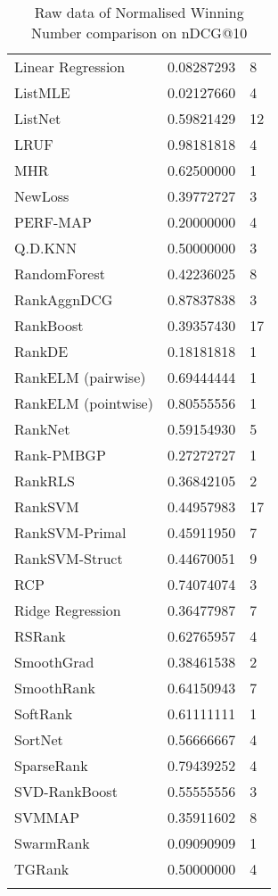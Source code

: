 \begin{longtable}{l|l|l}
Linear Regression & 0.08287293 & 8 \\ 
List\acs{MLE} & 0.02127660 & 4 \\ 
ListNet & 0.59821429 & 12 \\ 
LRUF & 0.98181818 & 4 \\ 
MHR & 0.62500000 & 1 \\ 
NewLoss & 0.39772727 & 3 \\ 
PERF-\acs{MAP} & 0.20000000 & 4 \\ 
Q.D.\acs{KNN} & 0.50000000 & 3 \\ 
RandomForest & 0.42236025 & 8 \\ 
RankAgg\acs{nDCG} & 0.87837838 & 3 \\ 
RankBoost & 0.39357430 & 17 \\ 
RankDE & 0.18181818 & 1 \\ 
RankELM (pairwise) & 0.69444444 & 1 \\ 
RankELM (pointwise) & 0.80555556 & 1 \\ 
RankNet & 0.59154930 & 5 \\ 
Rank-PMBGP & 0.27272727 & 1 \\ 
Rank\acs{RLS} & 0.36842105 & 2 \\ 
Rank\acs{SVM} & 0.44957983 & 17 \\ 
Rank\acs{SVM}-Primal & 0.45911950 & 7 \\ 
Rank\acs{SVM}-Struct & 0.44670051 & 9 \\ 
RCP & 0.74074074 & 3 \\ 
Ridge Regression & 0.36477987 & 7 \\ 
RSRank & 0.62765957 & 4 \\ 
SmoothGrad & 0.38461538 & 2 \\ 
SmoothRank & 0.64150943 & 7 \\ 
SoftRank & 0.61111111 & 1 \\ 
SortNet & 0.56666667 & 4 \\ 
SparseRank & 0.79439252 & 4 \\ 
\acs{SVD}-RankBoost & 0.55555556 & 3 \\ 
\acs{SVM}\acs{MAP} & 0.35911602 & 8 \\ 
SwarmRank & 0.09090909 & 1 \\ 
TGRank & 0.50000000 & 4 \\ 
\caption{Raw data of Normalised Winning Number comparison on \acs{nDCG}@10}
\label{winnum_ndcg10}
\end{longtable}